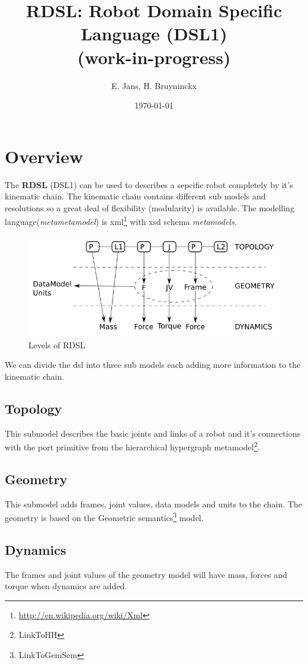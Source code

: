 \documentclass[11pt,a4paper,oneside]{article}
\begin{document}
\title{RDSL: Robot Domain Specific Language (DSL1)\\ {\Large(work-in-progress)}}


\author{E. Jans, H. Bruyninckx}
\date{\today}
\maketitle

\section{Overview}
\label{sec:overview}

The \textbf{RDSL} (DSL1) can be used to describes a sepcific robot
completely by it's kinematic chain. The kinematic chain contains
different sub models and resolutions so a great deal of flexibility
(modularity) is available. The modelling language(\textit{metametamodel})
is xml\footnote{\url{http://en.wikipedia.org/wiki/Xml}} with xsd schema
\textit{metamodels}.

\begin{figure}[h]
  \centering
  \includegraphics[width=1\columnwidth]{figs/RDSL_Layers}
  \caption{Levels of RDSL}
  \label{fig:rdsl-sketch}
\end{figure}

We can divide the dsl into three sub models each adding more information to the
kinematic chain.
 
\subsection{Topology}
\label{sub:topology}

This submodel describes the basic joints and links of a robot and it's connections
with the port primitive from the hierarchical hypergraph metamodel\footnote{LinkToHH}.

\subsection{Geometry}
\label{sub:geometry}

This submodel adds frames, joint values, data models and units to the chain. The
geometry is based on the Geometric semantics\footnote{LinkToGemSem} model.

\subsection{Dynamics}
\label{sub:dynamics}

The frames and joint values of the geometry model will have mass, forces and
torque when dynamics are added.
\end{document}

